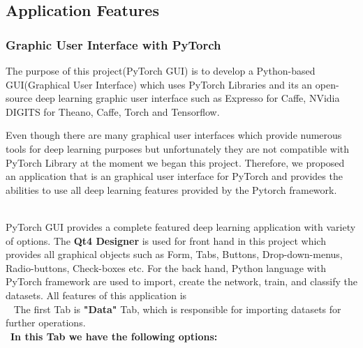 \subsection{Application Features}
\subsubsection{Graphic User Interface with PyTorch}
The purpose of this project(PyTorch GUI) is to develop a Python-based GUI(Graphical User Interface) 
which uses PyTorch Libraries and its an open-source deep learning graphic user interface such as Expresso for Caffe, NVidia DIGITS for Theano, Caffe, Torch and Tensorflow.
\par Even though there are many graphical user interfaces which provide numerous tools for deep learning purposes but unfortunately they are not
compatible with PyTorch Library at the moment we began this project. Therefore, we proposed an application that is an graphical user interface for PyTorch and provides the abilities to use all deep learning features provided by the Pytorch framework.
\\\
\par PyTorch GUI provides a complete featured deep learning application with variety of options.
The \textbf{Qt4 Designer} is used for front hand in this project which provides all graphical objects such as Form, Tabs, Buttons, Drop-down-menus, Radio-buttons, Check-boxes etc. 
For the back hand, Python language with PyTorch framework are used to import, create the network, train, and classify the datasets. All features of this application is 
\\\
\newpage
The first Tab is \textbf{"Data"} Tab, which is responsible for importing datasets for further operations.
\\\
\textbf{In this Tab we have the following options:} 
